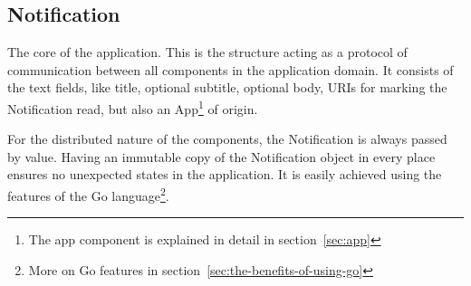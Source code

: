 \subsection{Notification}\label{sec:notification}

The core of the application.
This is the structure
acting as a protocol of communication
between all components in the application domain.
It consists of the text fields,
like title, optional subtitle, optional body,
\acp{URI} for marking the Notification read,
but also an App\footnote{
  The app component is explained in detail in section~\ref{sec:app}
} of origin.

For the distributed nature of the components,
the Notification is always passed by value.
Having an immutable copy of the Notification object
in every place ensures
no unexpected states in the application.
It is easily achieved
using the features of
the Go language\footnote{
  More on Go features in section~\ref{sec:the-benefits-of-using-go}
}.
